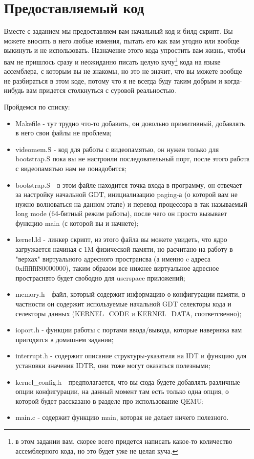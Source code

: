 \section{Предоставляемый код}

Вместе с заданием мы предоставляем вам начальный код и билд скрипт. Вы можете
вносить в него любые измения, пытать его как вам угодно или вообще выкинуть и
не использовать. Назначение этого кода упростить вам жизнь, чтобы вам не
пришлось сразу и неожиданно писать целую кучу\footnote{в этом задании вам,
скорее всего придется написать какое-то количество ассемблерного кода, но это
будет уже не целая куча.} кода на языке ассемблера, с которым вы не знакомы, но
это не значит, что вы можете вообще не разбираться в этом коде, потому что я не
всегда буду таким добрым и когда-нибудь вам придется столкнуться с суровой
реальностью.

Пройдемся по списку:
\begin{itemize}
  \item Makefile - тут трудно что-то добавить, он довольно примитивный,
        добавлять в него свои файлы не проблема;
  \item videomem.S - код для работы с видеопамятью, он нужен только для
        bootstrap.S пока вы не настроили последовательный порт, после этого
        работа с видеопамятью нам не понадобится;
  \item bootstrap.S - в этом файле находится точка входа в программу, он
        отвечает за настройку начальной GDT, инициализацию paging-а (о которой
        вам не нужно волноваться на данном этапе) и перевод процессора в так
        называемый long mode (64-битный режим работы), после чего он просто
        вызывает функцию main (с которой вы и начнете);
  \item kernel.ld - линкер скрипт, из этого файла вы можете увидеть, что ядро
        загружается начиная с 1M физической памяти, но расчитано на работу в
        "верхах" виртуального адресного пространсва (а именно c адреса
        0xffffffff80000000), таким образом все нижнее виртуальное адресное
        простраснвто будет свободно для userspace приложений;
  \item memory.h - файл, который содержит информацию о конфигурации памяти,
        в частности он содержит используемые начальной GDT селекторы кода и
        селекторы данных (KERNEL\_CODE и KERNEL\_DATA, соответсвенно);
  \item ioport.h - функции работы с портами ввода/вывода, которые наверняка вам
        пригодятся в домашнем задании;
  \item interrupt.h - содержит описание структуры-указателя на IDT и функцию
        для установки значения IDTR, они тоже могут оказаться полезными;
  \item kernel\_config.h - предполагается, что вы сюда будете добавлять
        различные опции конфигурации, на данный момент там есть только одна
        опция, о которой будет рассказано в разделе про использование QEMU;
  \item main.c - содержит функцию main, которая не делает ничего полезного.
\end{itemize}
